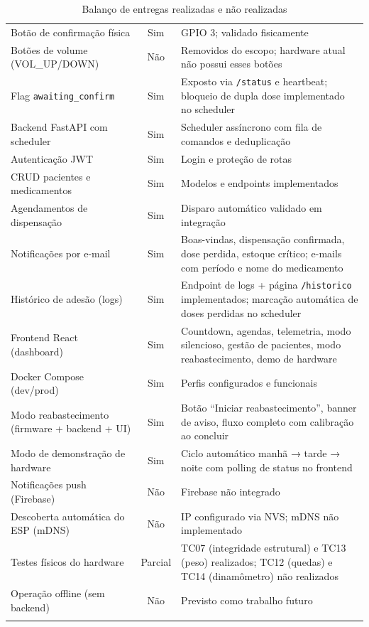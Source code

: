 \documentclass[12pt,a4paper]{article}
\newcommand{\lightrule}{\arrayrulecolor{gray!35}\midrule\arrayrulecolor{black}}
\begin{document}
\begin{longtable}{p{6.5cm}cp{5cm}}
    \lightrule
    Botão de confirmação física         & Sim  & GPIO 3; validado fisicamente \\
    \lightrule
    Botões de volume (VOL\_UP/DOWN)     & Não  & Removidos do escopo; hardware atual não possui esses botões \\
    \lightrule
    Flag \texttt{awaiting\_confirm}     & Sim  & Exposto via \texttt{/status} e heartbeat; bloqueio de dupla dose implementado no scheduler \\
    \lightrule
    Backend FastAPI com scheduler       & Sim  & Scheduler assíncrono com fila de comandos e deduplicação \\
    \lightrule
    Autenticação JWT                    & Sim  & Login e proteção de rotas \\
    \lightrule
    CRUD pacientes e medicamentos       & Sim  & Modelos e endpoints implementados \\
    \lightrule
    Agendamentos de dispensação         & Sim  & Disparo automático validado em integração \\
    \lightrule
    Notificações por e-mail             & Sim  & Boas-vindas, dispensação confirmada, dose perdida, estoque crítico; e-mails com período e nome do medicamento \\
    \lightrule
    Histórico de adesão (logs)          & Sim  & Endpoint de logs + página \texttt{/historico} implementados; marcação automática de doses perdidas no scheduler \\
    \lightrule
    Frontend React (dashboard)          & Sim  & Countdown, agendas, telemetria, modo silencioso, gestão de pacientes, modo reabastecimento, demo de hardware \\
    \lightrule
    Docker Compose (dev/prod)           & Sim  & Perfis configurados e funcionais \\
    \lightrule
    Modo reabastecimento (firmware + backend + UI) & Sim & Botão ``Iniciar reabastecimento'', banner de aviso, fluxo completo com calibração ao concluir \\
    \lightrule
    Modo de demonstração de hardware    & Sim  & Ciclo automático manhã → tarde → noite com polling de status no frontend \\
    \lightrule
    Notificações push (Firebase)        & Não  & Firebase não integrado \\
    \lightrule
    Descoberta automática do ESP (mDNS) & Não  & IP configurado via NVS; mDNS não implementado \\
    \lightrule
    Testes físicos do hardware          & Parcial & TC07 (integridade estrutural) e TC13 (peso) realizados; TC12 (quedas) e TC14 (dinamômetro) não realizados \\
    \lightrule
    Operação offline (sem backend)      & Não  & Previsto como trabalho futuro \\
    \bottomrule
    \caption{Balanço de entregas realizadas e não realizadas}
    \label{tab:entregas}
\end{longtable}
\end{document}
